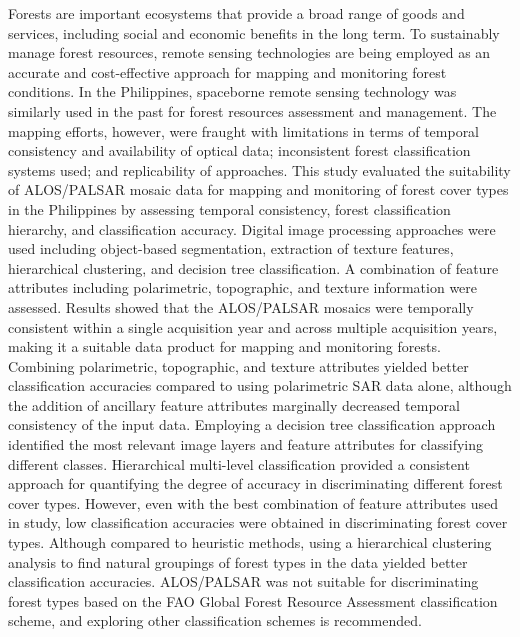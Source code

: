 
Forests are important ecosystems that provide a broad range of goods and services, including social and economic benefits in the long term. To sustainably manage forest resources, remote sensing technologies are being employed as an accurate and cost-effective approach for mapping and monitoring forest conditions. In the Philippines, spaceborne remote sensing technology was similarly used in the past for forest resources assessment and management. The mapping efforts, however, were fraught with limitations in terms of temporal consistency and availability of optical data; inconsistent forest classification systems used; and replicability of approaches. This study evaluated the suitability of ALOS/PALSAR mosaic data for mapping and monitoring of forest cover types in the Philippines by assessing temporal consistency, forest classification hierarchy, and classification accuracy. Digital image processing approaches were used including object-based segmentation, extraction of texture features, hierarchical clustering, and decision tree classification. A combination of feature attributes including polarimetric, topographic, and texture information were assessed. Results showed that the ALOS/PALSAR mosaics were temporally consistent within a single acquisition year and across multiple acquisition years, making it a suitable data product for mapping and monitoring forests. Combining polarimetric, topographic, and texture attributes yielded better classification accuracies compared to using polarimetric SAR data alone, although the addition of ancillary feature attributes marginally decreased temporal consistency of the input data. Employing a decision tree classification approach identified the most relevant image layers and feature attributes for classifying different classes. Hierarchical multi-level classification provided a consistent approach for quantifying the degree of accuracy in discriminating different forest cover types. However, even with the best combination of feature attributes used in study, low classification accuracies were obtained in discriminating forest cover types. Although compared to heuristic methods, using a hierarchical clustering analysis to find natural groupings of forest types in the data yielded better classification accuracies. ALOS/PALSAR was not suitable for discriminating forest types based on the FAO Global Forest Resource Assessment classification scheme, and exploring other classification schemes is recommended.
